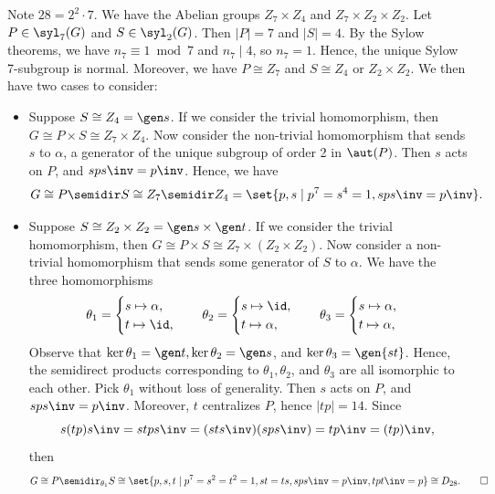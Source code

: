 \begin{sol}
    Note $28 = 2^2 \cdot 7$.
	We have the Abelian groups $Z_7 \times Z_4$ and $Z_7 \times Z_2 \times Z_2$.
	Let $P \in \syl_7(G)$ and $S \in \syl_2(G)$.
	Then $|P| = 7$ and $|S| = 4$.
	By the Sylow theorems, we have $n_7 \equiv 1 \bmod 7$ and $n_7 \mid 4$, so $n_7 = 1$.
	Hence, the unique Sylow 7-subgroup is normal.
	Moreover, we have $P \cong Z_7$ and $S \cong Z_4$ or $Z_2 \times Z_2$.
	We then have two cases to consider:
    \begin{itemize}
        \item Suppose $S \cong Z_4 = \gen s$.
        If we consider the trivial homomorphism, then $G \cong P \times S \cong Z_7 \times Z_4$.
        Now consider the non-trivial homomorphism that sends $s$ to $\alpha$, a generator of the unique subgroup of order 2 in $\aut(P)$.
        Then $s$ acts on $P$, and $sps\inv = p\inv$.
        Hence, we have
        \[
        	G \cong P \semidir S \cong Z_7 \semidir Z_4 = \set{p, s \mid p^7 = s^4 = 1, sps\inv = p\inv}.
        \]
        \item Suppose $S \cong Z_2 \times Z_2 = \gen s \times \gen t$.
        If we consider the trivial homomorphism, then $G \cong P \times S \cong Z_7 \times (Z_2 \times Z_2)$.
        Now consider a non-trivial homomorphism that sends some generator of $S$ to $\alpha$.
        We have the three homomorphisms
        \[
        	\theta_1 = 
            \begin{cases}
                s \mapsto \alpha, \\
                t \mapsto \id,
            \end{cases} \quad
            \theta_2 = 
            \begin{cases}
                s \mapsto \id, \\
                t \mapsto \alpha,
            \end{cases} \quad
            \theta_3 = 
            \begin{cases}
                s \mapsto \alpha, \\
                t \mapsto \alpha,
            \end{cases}
        \]
        Observe that $\ker\theta_1 = \gen t, \ker\theta_2 = \gen s$, and $\ker\theta_3 = \gen{st}$.
        Hence, the semidirect products corresponding to $\theta_1, \theta_2$, and $\theta_3$ are all isomorphic to each other.
        Pick $\theta_1$ without loss of generality.
        Then $s$ acts on $P$, and $sps\inv = p\inv$.
        Moreover, $t$ centralizes $P$, hence $|tp| = 14$.
        Since
        \[
        	s(tp)s\inv = stps\inv = (sts\inv)(sps\inv) = tp\inv = (tp)\inv,
        \]
        then
        \[
        	G \cong P \semidir_{\theta_1} S \cong \set{p, s, t \mid p^7 = s^2 = t^2 = 1, st = ts, sps\inv = p\inv, tpt\inv = p} \cong D_{28}. \qedhere
        \] 
    \end{itemize}
\end{sol}

